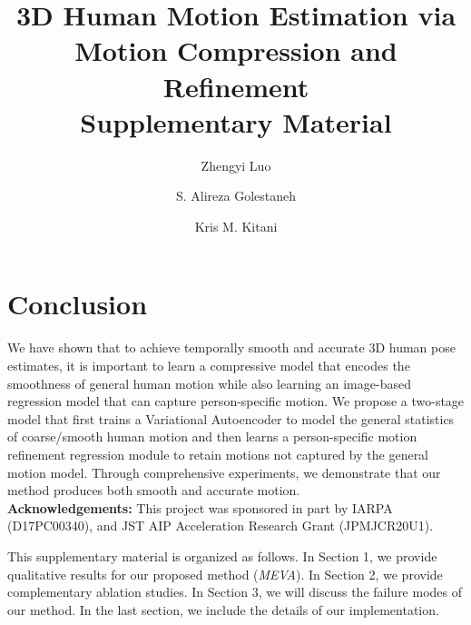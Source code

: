 \documentclass[runningheads]{llncs}
\begin{document}
\section{Conclusion}
We have shown that to achieve temporally smooth and accurate 3D human pose estimates, it is important to learn a compressive model that encodes the smoothness of general human motion while also learning an image-based regression model that can capture person-specific motion. We propose a two-stage model that first trains a Variational Autoencoder to model the general statistics of coarse/smooth human motion and then learns a person-specific motion refinement regression module to retain motions not captured by the general motion model. Through comprehensive experiments, we demonstrate that our method produces both smooth and accurate motion. \\

\textbf{Acknowledgements:} This project was sponsored in part by IARPA \\ (D17PC00340), and JST AIP Acceleration Research Grant (JPMJCR20U1).

































\clearpage{}







\title{3D Human Motion Estimation via \\Motion Compression and Refinement\\ Supplementary Material} 
\author{Zhengyi Luo \and S. Alireza Golestaneh \and Kris M. Kitani}


\maketitle
This supplementary material is organized as follows.  
In Section 1, we provide qualitative results for our proposed method (\textit{MEVA}).  In Section 2, we provide complementary ablation studies. In Section 3, we will discuss the failure modes of our method. In the last section, we include the details of our implementation. 
\end{document}
